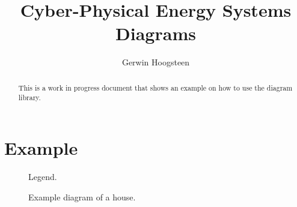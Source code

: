 \documentclass[a4paper,10pt]{article}
\title{Cyber-Physical Energy Systems Diagrams}
\author{Gerwin Hoogsteen}
\begin{document}
\maketitle

\begin{abstract}
This is a work in progress document that shows an example on how to use the diagram library.
\end{abstract}

\section{Example}
\begin{figure}[h]
\begin{center}

\caption{Legend.}
\label{fig:legend}
\end{center}
\end{figure}



\begin{figure}[h]
\begin{center}

\caption{Example diagram of a house.}
\label{fig:legend}
\end{center}
\end{figure}
\end{document}

